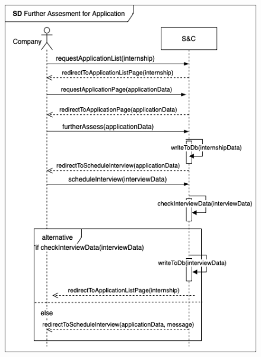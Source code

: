 \begin{enumerate}[label=\textbf{[US\arabic*]}, left = 0pt, align = left, resume]
            \newpage
            \begin{figure}[h!]
                \centering  \includegraphics{RASD/Images/UseCases/FurtherAssessment.drawio.png}
                \label{fig:example}
            \end{figure}
            
        \end{enumerate}

    \newpage
